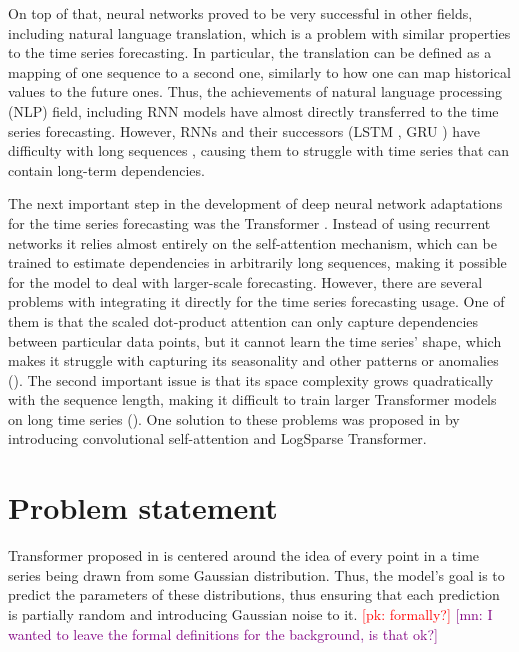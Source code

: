\documentclass[en]{pracamgr}
\newcommand{\pk}[1]{\textcolor{red}{\small [pk: #1]}}
\newcommand{\mn}[1]{\textcolor{purple}{\small [mn: #1]}}
\begin{document}
On top of that, neural networks proved to be very successful in other fields, including natural language translation, which is a problem with similar properties to the time series forecasting. In particular, the translation can be defined as a mapping of one sequence to a second one, similarly to how one can map historical values to the future ones. Thus, the achievements of natural language processing (NLP) field, including RNN models have almost directly transferred to the time series forecasting. However, RNNs and their successors (LSTM \cite{lstm}, GRU \cite{gru}) have difficulty with long sequences \cite{context}, causing them to struggle with time series that can contain long-term dependencies.

The next important step in the development of deep neural network adaptations for the time series forecasting was the Transformer \cite{tr}. Instead of using recurrent networks it relies almost entirely on the self-attention mechanism, which can be trained to estimate dependencies in arbitrarily long sequences, making it possible for the model to deal with larger-scale forecasting.
However, there are several problems with integrating it directly for the time series forecasting usage. One of them is that the scaled dot-product attention can only capture dependencies between particular data points, but it cannot learn the time series' shape, which makes it struggle with capturing its seasonality and other patterns or anomalies (\cite{enhancing}). The second important issue is that its space complexity grows quadratically with the sequence length, making it difficult to train larger Transformer models on long time series (\cite{enhancing}).
One solution to these problems was proposed in \cite{enhancing} by introducing convolutional self-attention and LogSparse Transformer.





%

\section*{Problem statement}\label{r:problemst}

Transformer proposed in \cite{enhancing} is centered around the idea of every point in a time series being drawn from some Gaussian distribution. Thus, the model's goal is to predict the parameters of these distributions, thus ensuring that each prediction is partially random and introducing Gaussian noise to it. \pk{formally?} \mn{I wanted to leave the formal definitions for the background, is that ok?}
\end{document}
